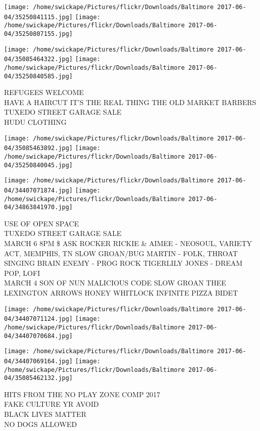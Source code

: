 \documentclass[10pt,letterpaper]{article}
\begin{document}
\texttt{[image: /home/swickape/Pictures/flickr/Downloads/Baltimore 2017-06-04/35250841115.jpg]}
\texttt{[image: /home/swickape/Pictures/flickr/Downloads/Baltimore 2017-06-04/35250807155.jpg]}

\texttt{[image: /home/swickape/Pictures/flickr/Downloads/Baltimore 2017-06-04/35085464322.jpg]}
\texttt{[image: /home/swickape/Pictures/flickr/Downloads/Baltimore 2017-06-04/35250840585.jpg]}

REFUGEES WELCOME\\
HAVE A HAIRCUT IT'S THE REAL THING THE OLD MARKET BARBERS\\
TUXEDO STREET GARAGE SALE\\
HUDU CLOTHING\\
\pagebreak

\texttt{[image: /home/swickape/Pictures/flickr/Downloads/Baltimore 2017-06-04/35085463892.jpg]}
\texttt{[image: /home/swickape/Pictures/flickr/Downloads/Baltimore 2017-06-04/35250840045.jpg]}

\texttt{[image: /home/swickape/Pictures/flickr/Downloads/Baltimore 2017-06-04/34407071874.jpg]}
\texttt{[image: /home/swickape/Pictures/flickr/Downloads/Baltimore 2017-06-04/34863841970.jpg]}

USE OF OPEN SPACE\\
TUXEDO STREET GARAGE SALE\\
MARCH 6 8PM \$ ASK ROCKER RICKIE \& AIMEE {-} NEOSOUL, VARIETY ACT, MEMPHIS, TN SLOW GROAN/BUG MARTIN {-} FOLK, THROAT SINGING BRAIN ENEMY {-} PROG ROCK TIGERLILY JONES {-} DREAM POP, LOFI\\
MARCH 4 SON OF NUN MALICIOUS CODE SLOW GROAN THEE LEXINGTON ARROWS HONEY WHITLOCK INFINITE PIZZA BIDET\\
\pagebreak

\texttt{[image: /home/swickape/Pictures/flickr/Downloads/Baltimore 2017-06-04/34407071124.jpg]}
\texttt{[image: /home/swickape/Pictures/flickr/Downloads/Baltimore 2017-06-04/34407070684.jpg]}

\texttt{[image: /home/swickape/Pictures/flickr/Downloads/Baltimore 2017-06-04/34407069164.jpg]}
\texttt{[image: /home/swickape/Pictures/flickr/Downloads/Baltimore 2017-06-04/35085462132.jpg]}

HITS FROM THE NO PLAY ZONE COMP 2017\\
FAKE CULTURE YR AVOID\\
BLACK LIVES MATTER\\
NO DOGS ALLOWED\\
\pagebreak
\end{document}
